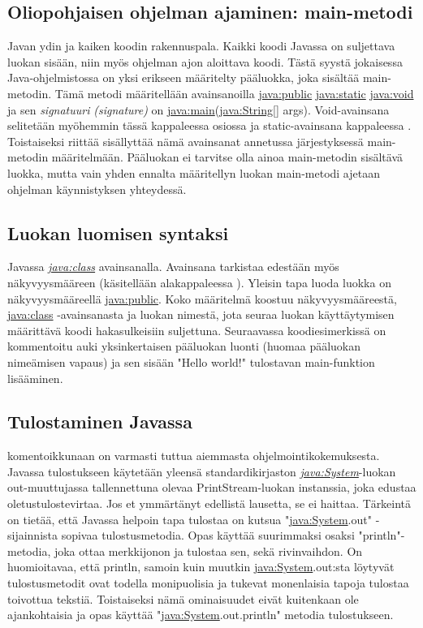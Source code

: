\documentclass{tufte-book}
\newcommand{\eng}[1]{\textit{(#1)}}
\newcommand{\new}[1]{\textit{\gls{#1}}}
\newcommand{\neweng}[2]{\new{#1} \eng{#2}}
\newcommand{\java}[1]{\underline{\gls{java:#1}}}
\newcommand{\newjava}[1]{\textit{\java{#1}}}
\begin{document}
\subsection{Oliopohjaisen ohjelman ajaminen: main-metodi}
\label{main}

 Javan ydin ja kaiken koodin rakennuspala. Kaikki koodi Javassa on
suljettava luokan sisään, niin myös ohjelman ajon aloittava koodi. Tästä syystä jokaisessa
Java-ohjelmistossa on yksi erikseen määritelty pääluokka, joka sisältää main-metodin. Tämä
metodi määritellään avainsanoilla \java{public} \java{static} \java{void} ja sen 
\neweng{signatuuri}{signature} on \java{main}(\java{String}[] args). Void-avainsana selitetään
myöhemmin tässä kappaleessa osiossa  ja static-avainsana kappaleessa
. Toistaiseksi riittää sisällyttää nämä avainsanat annetussa järjestyksessä
main-metodin määritelmään. Pääluokan ei tarvitse olla ainoa main-metodin sisältävä luokka, mutta
vain yhden ennalta määritellyn luokan main-metodi ajetaan ohjelman käynnistyksen yhteydessä.

\subsection{Luokan luomisen syntaksi}
\label{luokka}

 Javassa \newjava{class} avainsanalla. Avainsana tarkistaa edestään
myös näkyvyysmääreen (käsitellään alakappaleessa ). Yleisin tapa luoda
luokka on näkyvyysmääreellä \java{public}. Koko määritelmä koostuu näkyvyysmääreestä,
\java{class} -avainsanasta ja luokan nimestä, jota seuraa luokan käyttäytymisen määrittävä koodi
hakasulkeisiin suljettuna. Seuraavassa koodiesimerkissä on kommentoitu auki yksinkertaisen
pääluokan luonti (huomaa pääluokan nimeämisen vapaus) ja sen sisään "Hello world!" tulostavan
main-funktion lisääminen.

\subsection{Tulostaminen Javassa}
\label{print}

 komentoikkunaan on varmasti tuttua aiemmasta
ohjelmointikokemuksesta. Javassa tulostukseen käytetään yleensä standardikirjaston 
\newjava{System}-luokan out-muuttujassa tallennettuna olevaa PrintStream-luokan instanssia, joka
edustaa oletustulostevirtaa. Jos et ymmärtänyt edellistä lausetta, se ei haittaa. Tärkeintä on
tietää, että Javassa helpoin tapa tulostaa on kutsua "\java{System}.out" - sijainnista sopivaa
tulostusmetodia. Opas käyttää suurimmaksi osaksi "println"-metodia, joka ottaa merkkijonon ja
tulostaa sen, sekä rivinvaihdon. On huomioitavaa, että println, samoin kuin muutkin
\java{System}.out:sta löytyvät tulostusmetodit ovat todella monipuolisia ja tukevat monenlaisia
tapoja tulostaa toivottua tekstiä. Toistaiseksi nämä ominaisuudet eivät kuitenkaan ole
ajankohtaisia ja opas käyttää "\java{System}.out.println" metodia tulostukseen.
\end{document}
